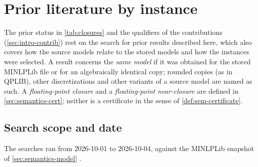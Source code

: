 \section{Prior literature by instance}\label{app:literature}

The prior status in \cref{tab:closures} and the qualifiers of the contributions (\cref{sec:intro-contrib}) rest on the search for prior results described here, which also covers how the source models relate to the stored models and how the instances were selected.
A result concerns the \emph{same model} if it was obtained for the stored MINLPLib file or for an algebraically identical copy; rounded copies (as in QPLIB), other discretizations and other variants of a source model are named as such.
A \emph{floating-point closure} and a \emph{floating-point near-closure} are defined in \cref{sec:semantics-cert}; neither is a certificate in the sense of \cref{def:sem-certificate}.

\subsection{Search scope and date}\label{app:literature-scope}

The searches ran from 2026-10-01 to 2026-10-04, against the MINLPLib snapshot of \cref{sec:semantics-model} \citep{cache2026-minlplib-pages-for-43-target}.

